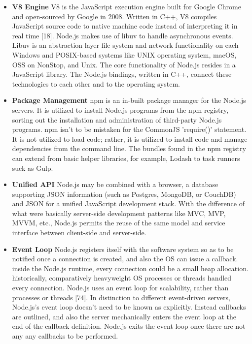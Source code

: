 \documentclass[../thesis.tex]{subfiles}
\begin{document}
\begin{itemize}
    \vspace{5mm}
    \item \textbf{V8 Engine}
    \vspace{5mm}
    V8 is the JavaScript execution engine built for Google Chrome and open-sourced by Google in 2008. Written in C++, V8 compiles JavaScript source code to native machine code instead of interpreting it in real time [18].
    \vspace{5mm}
    Node.js makes use of libuv to handle asynchronous events. Libuv is an abstraction layer file system and network functionality on each Windows and POSIX-based systems like UNIX operating system, macOS, OSS on NonStop, and Unix.
    \vspace{5mm}
    The core functionality of Node.js resides in a JavaScript library. The Node.js bindings, written in C++, connect these technologies to each other and to the operating system.
    \vspace{5mm}
    \item \textbf{Package Management}
    \vspace{5mm}
    npm is an in-built package manager for the Node.js servers. It is utilized to install Node.js programs from the npm registry, sorting out the installation and administration of third-party Node.js programs. npm isn't to be mistaken for the CommonJS 'require()' statement. It is not utilized to load code; rather, it is utilized to install code and manage dependencies from the command line. The bundles found in the npm registry can extend from basic helper libraries, for example, Lodash to task runners suck as Gulp.
    \vspace{5mm}
    \item \textbf{Unified API}
    \vspace{5mm}
    Node.js may be combined with a browser, a database supporting JSON information (such as Postgres, MongoDB, or CouchDB) and JSON for a unified JavaScript development stack. With the difference of what were basically server-side development patterns like MVC, MVP, MVVM, etc., Node.js permits the reuse of the same model and service interface between client-side and server-side.
    \vspace{5mm}
    \item \textbf{Event Loop}
    \vspace{5mm}
    Node.js registers itself with the software system so as to be notified once a connection is created, and also the OS can issue a callback. inside the Node.js runtime, every connection could be a small heap allocation. historically, comparatively heavyweight OS processes or threads handled every connection. Node.js uses an event loop for scalability, rather than processes or threads [74]. In distinction to different event-driven servers, Node.js's event loop doesn't need to be known as explicitly. Instead callbacks are outlined, and also the server mechanically enters the event loop at the end of the callback definition. Node.js exits the event loop once there are not any any callbacks to be performed.

\end{itemize}
\end{document}
